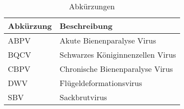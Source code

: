 \begin{table}[h!]
    \centering
    \caption{Abkürzungen}
    \label{tab:g:abkürzungen}
    \begin{tabular}{l|l}
        \toprule
        Abkürzung   &   Beschreibung\\
        \midrule
        ABPV        & Akute Bienenparalyse Virus\\
        BQCV        & Schwarzes Königinnenzellen Virus\\
        CBPV        & Chronische Bienenparalyse Virus\\
        DWV         & Flügeldeformationsvirus\\
        SBV         & Sackbrutvirus\\
        \bottomrule
    \end{tabular}
\end{table}